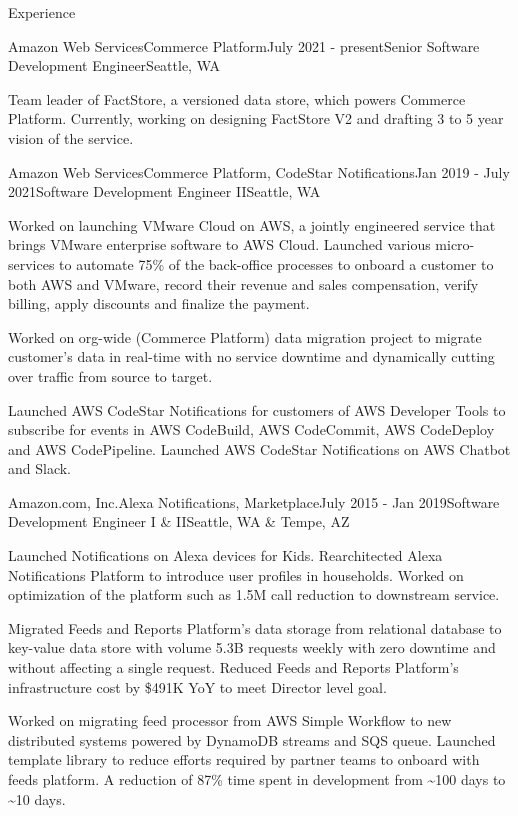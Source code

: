 \documentclass{resume} %
\begin{document}

\begin{rSection}{Experience}

    \begin{rSubsection}{Amazon Web Services}{Commerce Platform}{July 2021 - present}{Senior Software Development Engineer}{Seattle, WA}
    	\item Team leader of FactStore, a versioned data store, which powers Commerce Platform. Currently, working on designing FactStore V2 and drafting 3 to 5 year vision of the service.
    \end{rSubsection}
    
    \begin{rSubsection}{Amazon Web Services}{Commerce Platform, CodeStar Notifications}{Jan 2019 - July 2021}{Software Development Engineer II}{Seattle, WA}
    	\item Worked on launching VMware Cloud on AWS, a jointly engineered service that brings VMware enterprise software to AWS Cloud. Launched various micro-services to automate 75\% of the back-office processes to onboard a customer to both AWS and VMware, record their revenue and sales compensation, verify billing, apply discounts and finalize the payment.
    	\item Worked on org-wide (Commerce Platform) data migration project to migrate customer's data in real-time with no service downtime and dynamically cutting over traffic from source to target.
    	\item Launched AWS CodeStar Notifications for customers of AWS Developer Tools to subscribe for events in AWS CodeBuild, AWS CodeCommit, AWS CodeDeploy and AWS CodePipeline. Launched AWS CodeStar Notifications on AWS Chatbot and Slack.
	\end{rSubsection}

	\begin{rSubsection}{Amazon.com, Inc.}{Alexa Notifications, Marketplace}{July 2015 - Jan 2019}{Software Development Engineer I \& II}{Seattle, WA \& Tempe, AZ}
		\item Launched Notifications on Alexa devices for Kids. Rearchitected Alexa Notifications Platform to introduce user profiles in households. Worked on optimization of the platform such as 1.5M call reduction to downstream service.
		\item Migrated Feeds and Reports Platform's data storage from relational database to key-value data store with volume 5.3B requests weekly with zero downtime and without affecting a single request. Reduced Feeds and Reports Platform's infrastructure cost by \$491K YoY to meet Director level goal.
		\item Worked on migrating feed processor from AWS Simple Workflow to new distributed systems powered by DynamoDB streams and SQS queue. Launched template library to reduce efforts required by partner teams to onboard with feeds platform. A reduction of 87\% time spent in development from \~{}100 days to \~{}10 days.
	\end{rSubsection}
	

\end{rSection}
\end{document}
